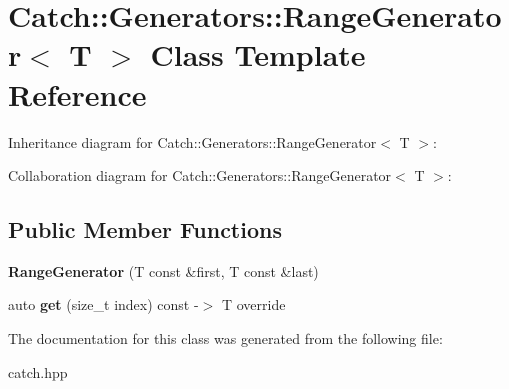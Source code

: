 \hypertarget{classCatch_1_1Generators_1_1RangeGenerator}{}\section{Catch\+:\+:Generators\+:\+:Range\+Generator$<$ T $>$ Class Template Reference}
\label{classCatch_1_1Generators_1_1RangeGenerator}


Inheritance diagram for Catch\+:\+:Generators\+:\+:Range\+Generator$<$ T $>$\+:


Collaboration diagram for Catch\+:\+:Generators\+:\+:Range\+Generator$<$ T $>$\+:
\subsection*{Public Member Functions}
\begin{DoxyCompactItemize}
\item 
\mbox{\label{classCatch_1_1Generators_1_1RangeGenerator_a56c5fcc855bdb668d7b93c2017a7c44c}} 
{\bfseries Range\+Generator} (T const \&first, T const \&last)
\item 
\mbox{\label{classCatch_1_1Generators_1_1RangeGenerator_a78f7f624b7545823d1a683ebf2ac00e7}} 
auto {\bfseries get} (size\+\_\+t index) const -\/$>$ T override
\end{DoxyCompactItemize}


The documentation for this class was generated from the following file\+:\begin{DoxyCompactItemize}
\item 
catch.\+hpp\end{DoxyCompactItemize}
